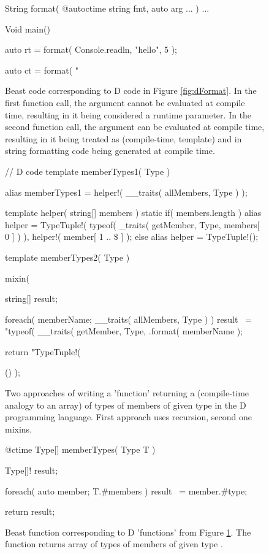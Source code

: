 \documentclass{ExcelAtFIT}
\begin{document}
\begin{figure}[h]
	\begin{code}
String format( @autoctime string fmt, auto arg ... ) { ... }

Void main() {
	auto rt = format( Console.readln, "hello", 5 );
	
	auto ct = format( "%
}
	\end{code}
	\caption{Beast code corresponding to D code in Figure \ref{fig:dFormat}. In the first  function call, the  argument cannot be evaluated at compile time, resulting in it being considered a runtime parameter. In the second function call, the argument can be evaluated at compile time, resulting in it being treated as \ctime (compile-time, template) and in string formatting code being generated at compile time.}
\end{figure}

\begin{figure}[h]
	\begin{dcode}
// D code
template memberTypes1( Type ) {
	alias memberTypes1 = helper!( __traits( allMembers, Type ) );
	
	template helper( string[] members ) {
		static if( members.length )
			alias helper = TypeTuple!(
				typeof( _traits( getMember, Type, members[ 0 ] ) ),
				helper!( member[ 1 .. $\$$ ] 
				);
		else
			alias helper = TypeTuple!();
	}
}

template memberTypes2( Type ) {
	mixin( {
		string[] result;
		
		foreach( memberName; __traits( allMembers, Type ) )
			result ~=
				"typeof( __traits( getMember, Type, %
				.format( memberName );	
		
		return "TypeTuple!( %
	}() );
}
	\end{dcode}
	\caption{Two approaches of writing a 'function' returning a  (compile-time analogy to an array) of types of members of given type  in the D programming language. First approach uses recursion, second one mixins.}
	\label{fig:dMemberTypes}
\end{figure}

\begin{figure}[h]
	\begin{code}
@ctime Type[] memberTypes( Type T ) {
	Type[]! result;
	
	foreach( auto member; T.#members )
	result ~= member.#type;
	
	return result;
}
	\end{code}
	\caption{Beast function corresponding to D 'functions' from Figure \ref{fig:dMemberTypes}. The function returns array of types of members of given type .}
\end{figure}
\end{document}
